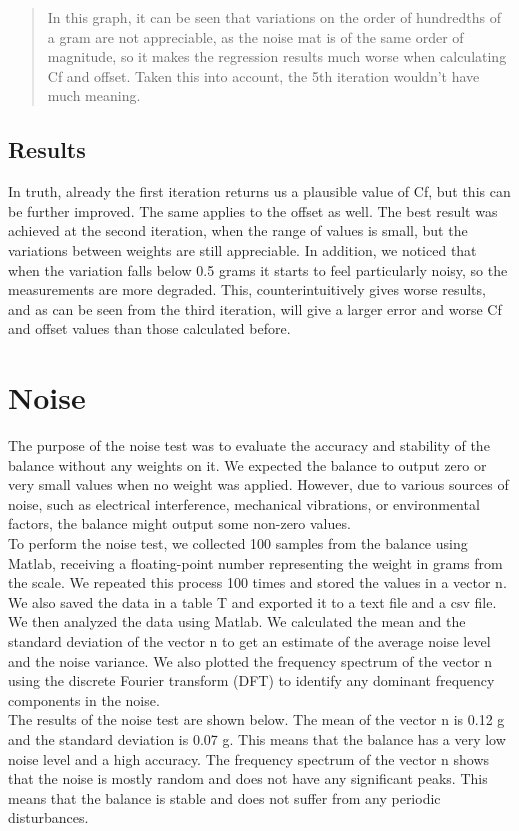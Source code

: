 \begin{quote}
In this graph, it can be seen that variations on the order of hundredths of a gram are not appreciable, as the noise mat is of the same order of magnitude, so it makes the regression results much worse when calculating Cf and offset. Taken this into account, the 5th iteration wouldn't have much meaning.
\end{quote}

\clearpage

\subsection{Results}

In truth, already the first iteration returns us a plausible value of Cf, but this can be further improved. The same applies to the offset as well. The best result was achieved at the second iteration, when the range of values is small, but the variations between weights are still appreciable. In addition, we noticed that when the variation falls below 0.5 grams it starts to feel particularly noisy, so the measurements are more degraded. This, counterintuitively gives worse results, and as can be seen from the third iteration, will give a larger error and worse Cf and offset values than those calculated before.

\section{Noise}

The purpose of the noise test was to evaluate the accuracy and stability of the balance without any weights on it. We expected the balance to output zero or very small values when no weight was applied. However, due to various sources of noise, such as electrical interference, mechanical vibrations, or environmental factors, the balance might output some non-zero values.
\\
To perform the noise test, we collected 100 samples from the balance using Matlab, receiving a floating-point number representing the weight in grams from the scale. We repeated this process 100 times and stored the values in a vector n. We also saved the data in a table T and exported it to a text file and a csv file.
\\
We then analyzed the data using Matlab. We calculated the mean and the standard deviation of the vector n to get an estimate of the average noise level and the noise variance. We also plotted the frequency spectrum of the vector n using the discrete Fourier transform (DFT) to identify any dominant frequency components in the noise.
\\
The results of the noise test are shown below. The mean of the vector n is 0.12 g and the standard deviation is 0.07 g. This means that the balance has a very low noise level and a high accuracy. The frequency spectrum of the vector n shows that the noise is mostly random and does not have any significant peaks. This means that the balance is stable and does not suffer from any periodic disturbances.

